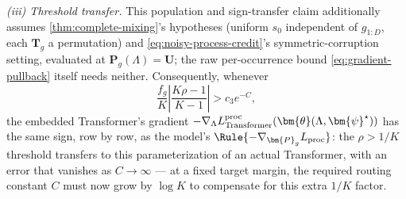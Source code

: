 \begin{proposition}
\emph{(iii) Threshold transfer.} This population and sign-transfer claim
additionally assumes \cref{thm:complete-mixing}'s hypotheses (uniform
$s_0$ independent of $g_{1:D}$, each $\bm T_g$ a permutation) and
\cref{eq:noisy-process-credit}'s symmetric-corruption setting,
evaluated at $\bm P_g(\Lambda)=\bm U$; the raw per-occurrence bound
\cref{eq:gradient-pullback} itself needs neither. Consequently, whenever
\begin{equation}
 \frac{f_g}{K}\left|\frac{K\rho-1}{K-1}\right|>c_3e^{-C},
 \label{eq:gradient-pullback-threshold}
\end{equation}
the embedded Transformer's gradient $-\nabla_\Lambda L_{\rm Transformer}^{\rm
proc}(\bm{\theta}(\Lambda,\bm{\psi}^\star))$ has the same sign, row by row, as the
model's $\Rule{-\nabla_{\bm{P}_g}L_{\rm proc}}$: the $\rho>1/K$ threshold
transfers to this parameterization of an actual Transformer, with an error
that vanishes as $C\to\infty$ --- at a fixed target margin, the required
routing constant $C$ must now grow by $\log K$ to compensate for this
extra $1/K$ factor.
\end{proposition}
